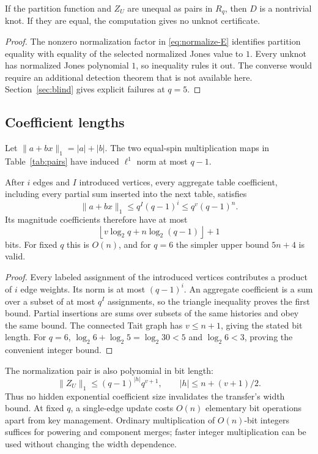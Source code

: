 \begin{proposition}\label{prop:obstruction}
If the partition function and $Z_U$ are unequal as pairs in $R_q$, then
$D$ is a nontrivial knot. If they are equal, the computation gives no
unknot certificate.
\end{proposition}
\begin{proof}
The nonzero normalization factor in \eqref{eq:normalize-E} identifies
partition equality with equality of the selected normalized Jones value to
$1$. Every unknot has normalized Jones polynomial $1$, so inequality rules
it out. The converse would require an additional detection theorem that
is not available here. Section~\ref{sec:blind} gives explicit failures at
$q=5$.
\end{proof}

\subsection{Coefficient lengths}

Let $\|a+bx\|_1=|a|+|b|$. The two equal-spin multiplication maps in
Table~\ref{tab:pairs} have induced $\ell^1$ norm at most $q-1$.

\begin{theorem}\label{thm:bits}
After $i$ edges and $I$ introduced vertices, every aggregate table
coefficient, including every partial sum inserted into the next table,
satisfies
\[
 \|a+bx\|_1\le q^I(q-1)^i\le q^v(q-1)^n.
\]
Its magnitude coefficients therefore have at most
\[
 \left\lfloor v\log_2q+n\log_2(q-1)\right\rfloor+1
\]
bits. For fixed $q$ this is $O(n)$, and for $q=6$ the simpler upper bound
$5n+4$ is valid.
\end{theorem}
\begin{proof}
Every labeled assignment of the introduced vertices contributes a product
of $i$ edge weights. Its norm is at most $(q-1)^i$.
An aggregate coefficient is a sum over a subset of at most $q^I$
assignments, so the triangle inequality proves the first bound. Partial
insertions are sums over subsets of the same histories and obey the same
bound. The connected Tait graph has $v\le n+1$, giving the stated bit length.
For $q=6$, $\log_2 6+\log_2 5=\log_2 30<5$ and
$\log_2 6<3$, proving the convenient integer bound.
\end{proof}

The normalization pair is also polynomial in bit length:
\[
 \|Z_U\|_1\le(q-1)^{|h|}q^{v+1},\qquad
 |h|\le n+(v+1)/2.
\]
Thus no hidden exponential coefficient size invalidates the transfer's
width bound. At fixed $q$, a single-edge update costs $O(n)$ elementary bit
operations apart from key management. Ordinary multiplication of
$O(n)$-bit integers suffices for powering and component merges; faster
integer multiplication can be used without changing the width dependence.

